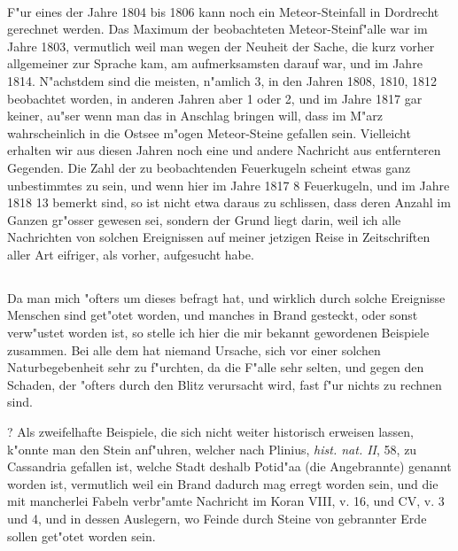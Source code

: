 \documentclass[a4paper, 11pt, oneside, polutonikogreek, german]{article}
\begin{document}
\paragraph{}
F"ur eines der Jahre 1804 bis 1806 kann noch ein Meteor-Steinfall in Dordrecht gerechnet werden. Das Maximum der beobachteten Meteor-Steinf"alle war im Jahre 1803, vermutlich weil man wegen der Neuheit der Sache, die kurz vorher allgemeiner zur Sprache kam, am aufmerksamsten darauf war, und im Jahre 1814. N"achstdem sind die meisten, n"amlich 3, in den Jahren 1808, 1810, 1812 beobachtet worden, in anderen Jahren aber 1 oder 2, und im Jahre 1817 gar keiner, au"ser wenn man das in Anschlag bringen will, dass im M"arz wahrscheinlich in die Ostsee m"ogen Meteor-Steine gefallen sein. Vielleicht erhalten wir aus diesen Jahren noch eine und andere Nachricht aus entfernteren Gegenden. Die Zahl der zu beobachtenden Feuerkugeln scheint etwas ganz unbestimmtes zu sein, und wenn hier im Jahre 1817 8 Feuerkugeln, und im Jahre 1818 13 bemerkt sind, so ist nicht etwa daraus zu schlissen, dass deren Anzahl im Ganzen gr"osser gewesen sei, sondern der Grund liegt darin, weil ich alle Nachrichten von solchen Ereignissen auf meiner jetzigen Reise in Zeitschriften aller Art eifriger, als vorher, aufgesucht habe.
\subsection{}
\paragraph{}
Da man mich "ofters um dieses befragt hat, und wirklich durch solche Ereignisse Menschen sind get"otet worden, und manches in Brand gesteckt, oder sonst verw"ustet worden ist, so stelle ich hier die mir bekannt gewordenen Beispiele zusammen. Bei alle dem hat niemand Ursache, sich vor einer solchen Naturbegebenheit sehr zu f"urchten, da die F"alle sehr selten, und gegen den Schaden, der "ofters durch den Blitz verursacht wird, fast f"ur nichts zu rechnen sind.

? Als zweifelhafte Beispiele, die sich nicht weiter historisch erweisen lassen, k"onnte man den Stein anf"uhren, welcher nach Plinius, \emph{hist. nat. II}, 58, zu Cassandria gefallen ist, welche Stadt deshalb Potid"aa (die Angebrannte) genannt worden ist, vermutlich weil ein Brand dadurch mag erregt worden sein, und die mit mancherlei Fabeln verbr"amte Nachricht im Koran VIII, v. 16, und CV, v. 3 und 4, und in dessen Auslegern, wo Feinde durch Steine von gebrannter Erde sollen get"otet worden sein.
\end{document}
